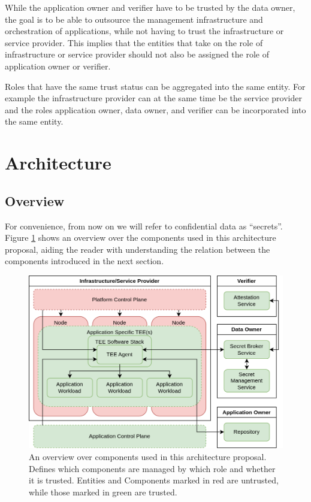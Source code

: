 While the application owner and verifier have to be trusted by the data owner,
the goal is to be able to outsource the management infrastructure and
orchestration of applications, while not having to trust the infrastructure or
service provider. This implies that the entities that take on the role of
infrastructure or service provider should not also be assigned the role of
application owner or verifier.

Roles that have the same trust status can be aggregated into the same entity.
For example the infrastructure provider can at the same time be the service
provider and the roles application owner, data owner, and verifier can be
incorporated into the same entity.

\section{Architecture}
\label{sec:proposal:architecture}

\subsection{Overview}

For convenience, from now on we will refer to confidential data as ``secrets''.
Figure \ref{fig:proposal:architecture-overview} shows an overview over the
components used in this architecture proposal, aiding the reader with
understanding the relation between the components introduced in the next
section.

\begin{figure}[ht]
  \centering
  \includegraphics[width=\linewidth]{resources/architecture-overview.png}
  \caption[A simplified overview over the Confidential Containers architecture]{
    An overview over components used in this architecture proposal. Defines
    which components are managed by which role and whether it is trusted.
    Entities and Components marked in red are untrusted, while those marked in
    green are trusted.}
  \label{fig:proposal:architecture-overview}
\end{figure}


